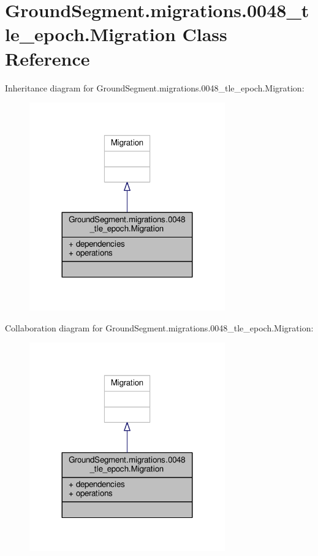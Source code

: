 \hypertarget{class_ground_segment_1_1migrations_1_10048__tle__epoch_1_1_migration}{}\section{Ground\+Segment.\+migrations.0048\+\_\+tle\+\_\+epoch.Migration Class Reference}
\label{class_ground_segment_1_1migrations_1_10048__tle__epoch_1_1_migration}


Inheritance diagram for Ground\+Segment.\+migrations.0048\+\_\+tle\+\_\+epoch.Migration\+:\nopagebreak
\begin{figure}[H]
\begin{center}
\leavevmode
\includegraphics[width=239pt]{class_ground_segment_1_1migrations_1_10048__tle__epoch_1_1_migration__inherit__graph}
\end{center}
\end{figure}


Collaboration diagram for Ground\+Segment.\+migrations.0048\+\_\+tle\+\_\+epoch.Migration\+:\nopagebreak
\begin{figure}[H]
\begin{center}
\leavevmode
\includegraphics[width=239pt]{class_ground_segment_1_1migrations_1_10048__tle__epoch_1_1_migration__coll__graph}
\end{center}
\end{figure}
